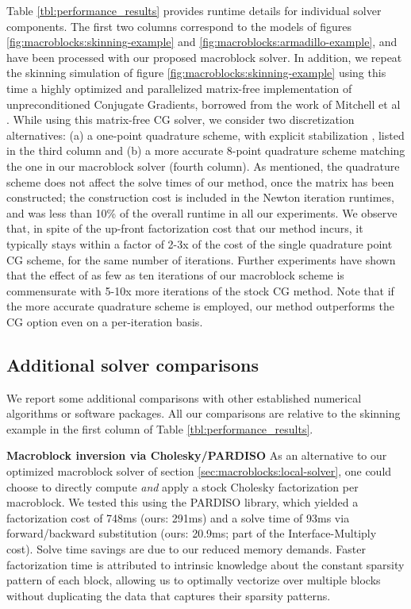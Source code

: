 Table \ref{tbl:performance_results} provides runtime details for
individual solver components. The first two columns correspond to the
models of figures \ref{fig:macroblocks:skinning-example} and
\ref{fig:macroblocks:armadillo-example}, and have been processed with our proposed
macroblock solver. In addition, we repeat the skinning simulation of
figure \ref{fig:macroblocks:skinning-example} using this time a highly optimized
and parallelized matrix-free implementation of unpreconditioned
Conjugate Gradients, borrowed from the work of Mitchell et al
\cite{MitchCS:2015}. While using this matrix-free CG solver, we
consider two discretization alternatives: (a) a one-point quadrature
scheme, with explicit stabilization
\cite{McAdaZSETTS:2011,PatteMS:2012}, listed in the third column and
(b) a more accurate 8-point quadrature scheme matching the one in our
macroblock solver (fourth column). As mentioned, the quadrature scheme
does not affect the solve times of our method, once the matrix has
been constructed; the construction cost is included in the Newton
iteration runtimes, and was less than 10\% of the overall runtime in
all our experiments. We observe that, in spite of the up-front
factorization cost that our method incurs, it typically stays within a
factor of 2-3x of the cost of the single quadrature point CG scheme,
for the same number of iterations. Further experiments have shown that
the effect of as few as ten iterations of our macroblock scheme is
commensurate with 5-10x more iterations of the stock CG method. Note
that if the more accurate quadrature scheme is employed, our method
outperforms the CG option even on a per-iteration basis.

\subsection{Additional solver comparisons} 

We report some additional comparisons with other established numerical
algorithms or software packages. All our comparisons are relative to
the skinning example in the first column of Table
\ref{tbl:performance_results}.

\noindent\textbf{Macroblock inversion via Cholesky/PARDISO} As an
alternative to our optimized macroblock solver of section
\ref{sec:macroblocks:local-solver}, one could choose to directly compute
\emph{and} apply a stock Cholesky factorization per macroblock. We
tested this using the PARDISO library, which yielded a factorization
cost of 748ms (ours: 291ms) and a solve time of 93ms via
forward/backward substitution (ours: 20.9ms; part of the
\textsf{Interface-Multiply} cost). Solve time savings are due to our
reduced memory demands. Faster factorization time is attributed to
intrinsic knowledge about the constant sparsity pattern of each block,
allowing us to optimally vectorize over multiple blocks without
duplicating the data that captures their sparsity patterns.

